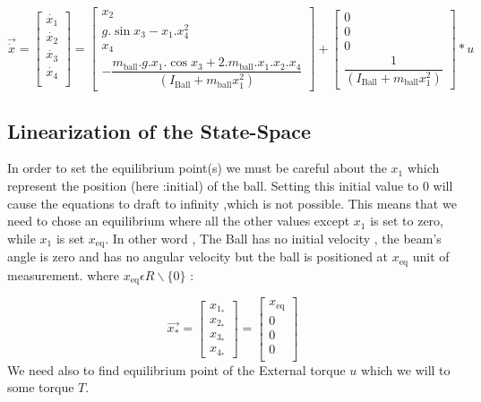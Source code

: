 \documentclass{article}
\begin{document}
\begin{equation}
	\vec{\dot{x}} =
	\begin{bmatrix}
		\dot{x_1} \\
		\dot{x_2} \\
		\dot{x_3} \\
		\dot{x_4} \\
	\end{bmatrix} =
	\begin{bmatrix}
		x_2\\
		g.\sin{x_3} - x_1.x_4^2 \\
		x_4\\
		-\dfrac{m_{\text{ball}}.g.x_1.\cos{x_3} + 2.m_{\text{ball}}.x_1.x_2.x_4}{(I_{\text{Ball} } + m_{\text{ball}} x_1^2)}
	\end{bmatrix}+
	\begin{bmatrix}
		0 \\
		0\\
		0\\
		\dfrac{1}{(I_{\text{Ball}} + m_{\text{ball}} x_1^2)}
	\end{bmatrix}*u
\end{equation}
\newpage
\subsection{Linearization of the State-Space}
In order to set the equilibrium point(s) we must be careful about the $x_1$ which represent the position (here :initial) of the ball.
Setting this initial value to 0 will cause the equations to draft to infinity ,which is not possible.
This means that we need to chose an equilibrium where all the other values except $x_1$ is set to zero, while $x_1$ is set $x_{\text{eq}}$.
In other word , The Ball has no initial velocity , the beam's angle is zero and has no angular velocity but the ball is positioned at $x_{\text{eq}}$ unit of measurement.
where $x_{\text{eq}} \epsilon R\backslash\{0\}$ :

\begin{equation}
	\vec{x_*} =
	\begin{bmatrix}
		x_{\text{$1_*$}} \\
		x_{\text{$2_*$}} \\
		x_{\text{$3_*$}} \\
		x_{\text{$4_*$}}
	\end{bmatrix}=
	\begin{bmatrix}
		x_{\text{eq}}\\
		0 \\
		0 \\
		0 \\
	\end{bmatrix}
\end{equation}
We need also to find equilibrium point of the External torque $u$ which we will to some torque $T$.
\end{document}
